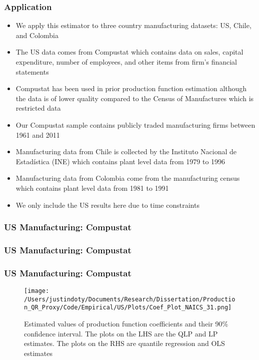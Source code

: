\documentclass{beamer}
\begin{document}
\begin{frame}
\frametitle{Application}
\begin{itemize}
	\item We apply this estimator to three country manufacturing datasets: US, Chile, and Colombia
	\item The US data comes from Compustat which contains data on sales, capital expenditure, number of employees, and other items from firm's financial statements
	\item Compustat has been used in prior production function estimation although the data is of lower quality compared to the Census of Manufactures which is restricted data
	\item Our Compustat sample contains publicly traded manufacturing firms between 1961 and 2011
	\item Manufacturing data from Chile is collected by the Instituto Nacional de Estad\'{i}stica (INE) which contains plant level data from 1979 to 1996
	\item Manufacturing data from Colombia come from the manufacturing census which contains plant level data from 1981 to 1991 
	\item We only include the US results here due to time constraints
\end{itemize}
\end{frame}


\begin{frame}
\frametitle{US Manufacturing: Compustat}
\scriptsize

\end{frame}

\begin{frame}
\frametitle{US Manufacturing: Compustat}
\scriptsize

\end{frame}

\begin{frame}
\frametitle{US Manufacturing: Compustat}
\begin{figure}[ht]
\centering
\texttt{[image: /Users/justindoty/Documents/Research/Dissertation/Production\_QR\_Proxy/Code/Empirical/US/Plots/Coef\_Plot\_NAICS\_31.png]}
\caption{Estimated values of production function coefficients and their 90\% confidence interval. The plots on the LHS are the QLP and LP estimates. The plots on the RHS are quantile regression and OLS estimates}
\end{figure}
\end{frame}
\end{document}
